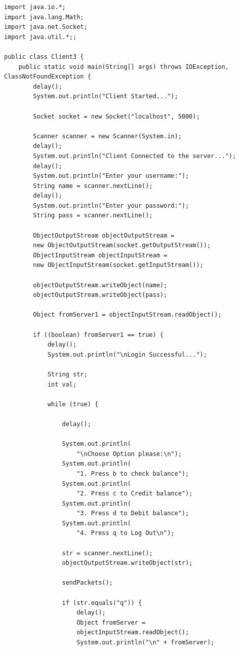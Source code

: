 \documentclass[11pt]{article}
\begin{document}
\begin{verbatim}
import java.io.*;
import java.lang.Math;
import java.net.Socket;
import java.util.*;;

public class Client3 {
    public static void main(String[] args) throws IOException, ClassNotFoundException {
        delay();
        System.out.println("Client Started...");

        Socket socket = new Socket("localhost", 5000);

        Scanner scanner = new Scanner(System.in);
        delay();
        System.out.println("Client Connected to the server...");
        delay();
        System.out.println("Enter your username:");
        String name = scanner.nextLine();
        delay();
        System.out.println("Enter your password:");
        String pass = scanner.nextLine();

        ObjectOutputStream objectOutputStream = 
        new ObjectOutputStream(socket.getOutputStream());
        ObjectInputStream objectInputStream = 
        new ObjectInputStream(socket.getInputStream());

        objectOutputStream.writeObject(name);
        objectOutputStream.writeObject(pass);

        Object fromServer1 = objectInputStream.readObject();

        if ((boolean) fromServer1 == true) {
            delay();
            System.out.println("\nLogin Successful...");

            String str;
            int val;

            while (true) {

                delay();

                System.out.println(
                    "\nChoose Option please:\n");
                System.out.println(
                    "1. Press b to check balance");
                System.out.println(
                    "2. Press c to Credit balance");
                System.out.println(
                    "3. Press d to Debit balance");
                System.out.println(
                    "4. Press q to Log Out\n");

                str = scanner.nextLine();
                objectOutputStream.writeObject(str);

                sendPackets();

                if (str.equals("q")) {
                    delay();
                    Object fromServer = 
                    objectInputStream.readObject();
                    System.out.println("\n" + fromServer);


\end{verbatim}
\end{document}
